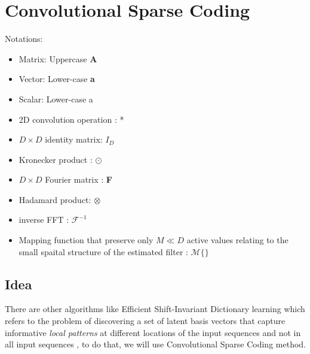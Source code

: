 \documentclass[a4paper,10pt]{article}
\begin{document}
\newpage
\section{Convolutional Sparse Coding}
Notations:
\begin{itemize}
 \item Matrix: Uppercase  \textbf{A}
 \item Vector: Lower-case  \textbf{a}
 \item Scalar: Lower-case a
 \item 2D convolution operation : *
 \item $D \times D$ identity matrix: \textbf{$I_D$}
 \item Kronecker product : $\odot$
 \item $D \times D$ Fourier matrix : \textbf{F}
 \item Hadamard product: $\otimes$
 \item inverse FFT : $ \mathcal{F}^{-1}$
 \item Mapping function that preserve only $M \ll D$ active values relating to the small spaital structure of the estimated filter : $ \mathcal{M}\{\}$
\end{itemize} 
\subsection{Idea}
There are other algorithms like Efficient Shift-Invariant Dictionary learning which refers to the problem of discovering a set of latent basis vectors that capture informative \textit{local patterns} at different locations of the input sequences and not in all input sequences \cite{Zheng:2016:ESD:2939672.2939824}, to do that, we will use Convolutional Sparse Coding method.  
\end{document}
